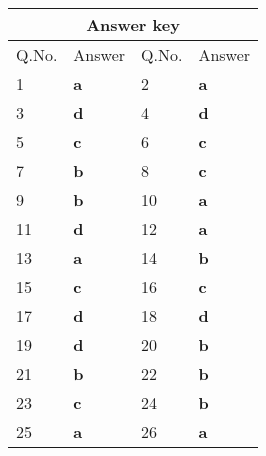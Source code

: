 \setlength\arrayrulewidth{1pt}
\begin{table}[H]
	\centering
	
	\begin{tabular}{|p{1.5cm}|p{1.5cm}||p{1.5cm}|p{1.5cm}|}
		\hline
		\multicolumn{4}{|c|}{\textbf{Answer key}}\\\hline\hline
		\rowcolor{ocrel}Q.No.&Answer&Q.No.&Answer\\\hline
		1&\textbf{a}&2&\textbf{a}\\\hline
		3&\textbf{d}&4&\textbf{d}\\\hline
		5&\textbf{c}&6&\textbf{c}\\\hline
		7&\textbf{b}&8&\textbf{c}\\\hline
		9&\textbf{b}&10&\textbf{a}\\\hline
		11&\textbf{d}&12&\textbf{a}\\\hline
		13&\textbf{a}&14&\textbf{b}\\\hline
		15&\textbf{c}&16&\textbf{c}\\\hline
		17&\textbf{d}&18&\textbf{d}\\\hline
		19&\textbf{d}&20&\textbf{b}\\\hline
		21&\textbf{b}&22&\textbf{b}\\\hline
		23&\textbf{c}&24&\textbf{b}\\\hline
		25&\textbf{a}&26&\textbf{a}\\\hline
	\end{tabular}
\end{table}
       
       
       
       
       
       
 
